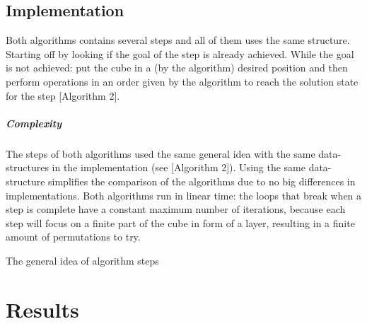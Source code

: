 \documentclass[a4paper,11pt]{kth-mag}
\begin{document}
\section{Implementation}
	Both algorithms contains several steps and all of them uses the same structure. Starting off by looking if the goal of the step is already achieved. While the goal is not achieved: put the cube in a (by the algorithm) desired position and then perform operations in an order given by the algorithm to reach the solution state for the step [Algorithm 2].
	\raggedbottom
	\paragraph{Complexity} The steps of both algorithms used the same general idea with the same data-structures in the implementation (see [Algorithm 2]). Using the same data-structure simplifies the comparison of the algorithms due to no big differences in implementations. Both algorithms run in linear time: the loops that break when a step is complete have a constant maximum number of iterations, because each step will focus on a finite part of the cube in form of a layer, resulting in a finite amount of permutations to try.\\
	\begin{algorithm}[H]
	\caption{The general idea of algorithm steps}
	\end{algorithm}

	
\chapter{Results}
\end{document}
